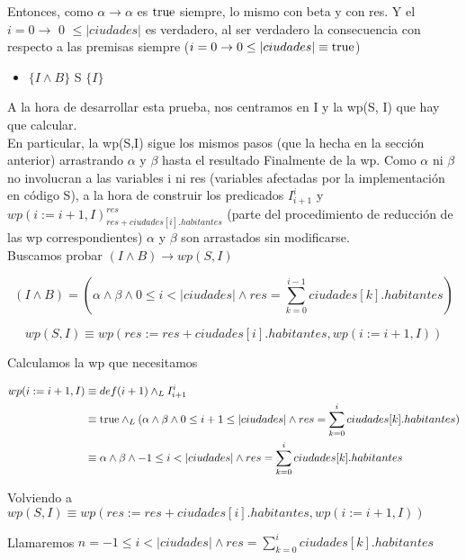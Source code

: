 \documentclass[10pt,a4paper]{article}
\begin{document}
\begin {enumerate}
    Entonces, como $\alpha \to \alpha$ es $\mathrm{true}$ siempre, lo mismo con beta y con res. Y el $i = 0\to$ 0 $\leq |ciudades|$ es verdadero, al ser
    verdadero la consecuencia con respecto a las premisas siempre ($i = 0\to  0 \leq |ciudades| \equiv \mathrm{true}$) 

    
    \begin{itemize}
        \item $\{ I \land B \}$ S $ \{ I\}$
    \end{itemize}

    A la hora de desarrollar esta prueba, nos centramos en I y la wp(S, I) que hay que calcular. \\
    En particular, la wp(S,I) sigue los mismos pasos (que la hecha en la sección anterior) arrastrando $\alpha $ y $\beta$ hasta el resultado Finalmente
    de la wp. Como $\alpha $ ni $\beta$ no involucran a las variables i ni res (variables afectadas por la implementación en código S), a la
    hora de construir los predicados $I_{i + 1}^{i}$ y $wp(i := i + 1, I)_{res + ciudades[i].habitantes}^{res}$ (parte del procedimiento de 
    reducción de las wp correspondientes) $\alpha $ y $\beta$ son arrastados sin modificarse. \\

    Buscamos probar $(I \land B) \to wp(S, I)$

    $$ (I \land B) = (\alpha \land \beta \land 0 \leq i < |ciudades| \land res = \sum\limits_{k=0}^{i - 1}{ciudades[k].habitantes})$$

    $$wp(S, I) \equiv wp(res := res + ciudades[i].habitantes, wp(i := i + 1, I))$$

    Calculamos la wp que necesitamos

    \begin{align*}
        wp (i := i + 1, I) &\equiv def(i + 1) \land _L I_{i +1}^{i} \\
        &\equiv \mathrm{true} \land _L (\alpha \land \beta \land 0 \leq i + 1 \leq |ciudades| \land res = \sum\limits_{k=0}^{i}{ciudades[k].habitantes}) \\
        &\equiv \alpha \land \beta \land -1 \leq i < |ciudades| \land res =  \sum\limits_{k=0}^{i}{ciudades[k].habitantes} 
    \end{align*}

    Volviendo a $wp(S, I) \equiv wp(res := res + ciudades[i].habitantes, wp(i := i + 1, I))$

    Llamaremos $n = -1 \leq i < |ciudades| \land res =  \sum\limits_{k=0}^{i}{ciudades[k].habitantes} $


\end{enumerate}
\end{document}
